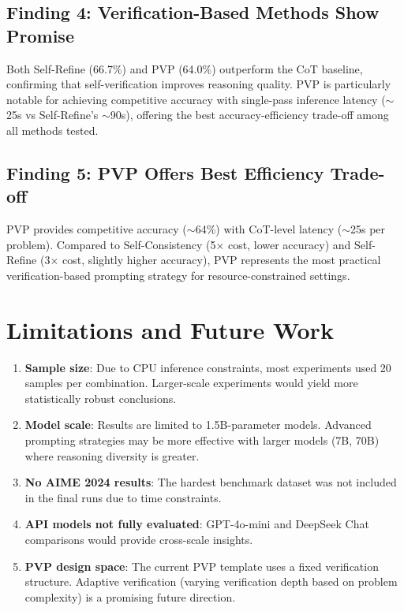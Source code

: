 \documentclass[conference]{IEEEtran}
\begin{document}
\subsection{Finding 4: Verification-Based Methods Show Promise}

Both Self-Refine (66.7\%) and PVP (64.0\%) outperform the CoT baseline, confirming that self-verification improves reasoning quality. PVP is particularly notable for achieving competitive accuracy with single-pass inference latency (${\sim}$25s vs Self-Refine's ${\sim}$90s), offering the best accuracy-efficiency trade-off among all methods tested.

\subsection{Finding 5: PVP Offers Best Efficiency Trade-off}

PVP provides competitive accuracy (${\sim}$64\%) with CoT-level latency (${\sim}$25s per problem). Compared to Self-Consistency (5$\times$ cost, lower accuracy) and Self-Refine (3$\times$ cost, slightly higher accuracy), PVP represents the most practical verification-based prompting strategy for resource-constrained settings.

\section{Limitations and Future Work}

\begin{enumerate}
    \item \textbf{Sample size}: Due to CPU inference constraints, most experiments used 20 samples per combination. Larger-scale experiments would yield more statistically robust conclusions.
    \item \textbf{Model scale}: Results are limited to 1.5B-parameter models. Advanced prompting strategies may be more effective with larger models (7B, 70B) where reasoning diversity is greater.
    \item \textbf{No AIME 2024 results}: The hardest benchmark dataset was not included in the final runs due to time constraints.
    \item \textbf{API models not fully evaluated}: GPT-4o-mini and DeepSeek Chat comparisons would provide cross-scale insights.
    \item \textbf{PVP design space}: The current PVP template uses a fixed verification structure. Adaptive verification (varying verification depth based on problem complexity) is a promising future direction.
\end{enumerate}
\end{document}
